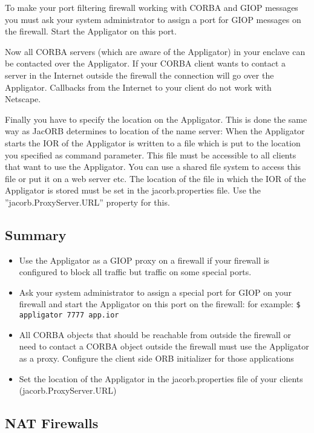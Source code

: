 \documentclass[12pt]{scrbook}
\begin{document}
To make your port filtering firewall working with CORBA and GIOP
messages you must ask your system administrator to assign a port for
GIOP messages on the firewall. Start the Appligator on this port. 

Now all CORBA servers (which are aware of the Appligator) in your
enclave can be contacted over the Appligator. If your CORBA client
wants to contact a server in the Internet outside the firewall the
connection will go over the Appligator. Callbacks from the Internet to
your client do not work with Netscape.

Finally you have to specify the location on the Appligator. This is
done the same way as JacORB determines to location of the name server:
When the Appligator starts the IOR of the Appligator is written to a
file which is put to the location you specified as command
parameter. This file must be accessible to all clients that want to
use the Appligator. You can use a shared file system to access this
file or put it on a web server etc. The location of the file in which
the IOR of the Appligator is stored must be set in the
jacorb.properties file. Use the ''jacorb.ProxyServer.URL'' property
for this. 

\subsection{Summary}

\begin{itemize}
\item Use the Appligator as a GIOP proxy on a firewall if your
  firewall is configured to block all traffic but traffic on some
  special ports. 
\item Ask your system administrator to assign a special port for GIOP
  on your firewall and start the Appligator on this port on the
  firewall: for example:
\verb+$ appligator 7777 app.ior+
\item All CORBA objects that should be reachable from outside the firewall or need to contact a CORBA object outside the firewall must use the Appligator as a proxy. Configure the client side ORB initializer for those applications 
\item Set the location of the Appligator in the jacorb.properties file
  of your clients (jacorb.ProxyServer.URL)
\end{itemize}

\subsection{NAT Firewalls}
\end{document}
